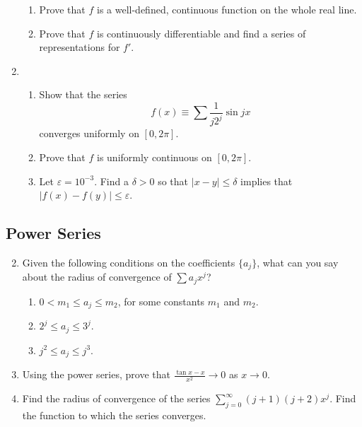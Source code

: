 \documentclass{article}
\begin{document}
\begin{enumerate}
\[            \]
            \begin{enumerate}
                  \item Prove that $f$ is a well-defined, continuous function
                        on the whole real line.
                  \item Prove that $f$ is continuously differentiable and find a
                        series of representations for $f'$.
            \end{enumerate}
            \setcounter{enumi}{10}
      \item \begin{enumerate}
                  \item Show that the series
                        \[
                              f(x)\equiv \sum \frac{1}{j2^j}\sin jx
                        \]
                        converges uniformly on $[0,2\pi]$.
                  \item Prove that $f$ is uniformly continuous on $[0,2\pi]$.
                  \item Let $\varepsilon=10^{-3}$. Find a $\delta>0$ so that
                        $\lvert x-y\rvert\leq \delta$ implies that
                        $\lvert f(x)-f(y)\rvert\leq \varepsilon$.
            \end{enumerate}
\end{enumerate}

\subsection{Power Series}

\begin{enumerate}
      \setcounter{enumi}{1}
      \item Given the following conditions on the coefficients $\{a_j\}$, what
            can you say about the radius of convergence of $\sum a_jx^j$?
            \begin{enumerate}
                  \item $0<m_1\leq a_j\leq m_2$, for some constants $m_1$ and $m_2$.
                  \item $2^j\leq a_j\leq 3^j$.
                  \item $j^2\leq a_j\leq j^3$.
            \end{enumerate}
            \setcounter{enumi}{5}
      \item Using the power series, prove that
            $\frac{\tan x-x}{x^2}\to 0$ as $x\to 0$.
            \setcounter{enumi}{10}
      \item Find the radius of convergence of the series
            $\sum_{j=0}^\infty(j+1)(j+2)x^j$. Find the function to which
            the series converges.
\end{enumerate}
\end{document}
